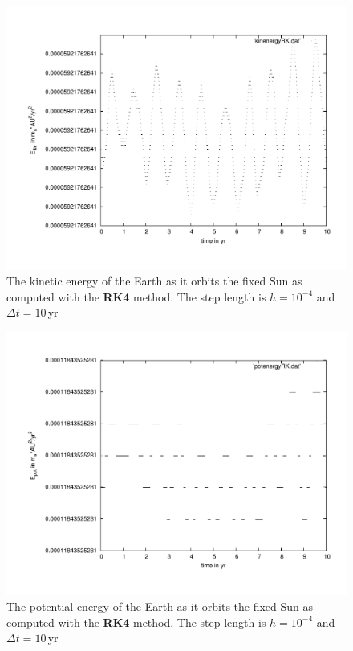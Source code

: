 \documentclass[11pt,a4wide]{article}
\begin{document}
	
	\begin{figure}
		\centering
			\includegraphics[scale=0.45]{kinenergRK.pdf}
		\caption{The kinetic energy of the Earth as it orbits the fixed Sun as computed with the \textbf{RK4} method. The step length is $h=10^{-4}$ and $\Delta t=10$\,yr}
		\label{fig:ekrk}
	\end{figure}
	
	\begin{figure}
		\centering
			\includegraphics[scale=0.45]{potenergRK.pdf}
		\caption{The potential energy of the Earth as it orbits the fixed Sun as computed with the \textbf{RK4} method. The step length is $h=10^{-4}$ and $\Delta t=10$\,yr}
		\label{fig:eprk}
	\end{figure}
	
\end{document}
